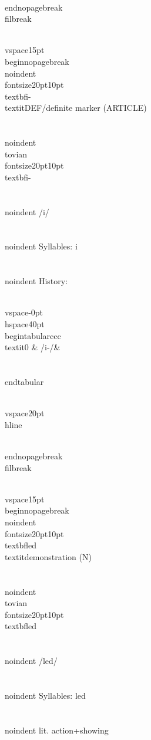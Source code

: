 \\end{nopagebreak}
\\filbreak



\\vspace{15pt}
\\begin{nopagebreak}
\\noindent{\\fontsize{20pt}{10pt}\\textbf{i-} } \\textit{DEF/definite marker} (ARTICLE)\\\\
\\noindent {\\tovian \\fontsize{20pt}{10pt} \\textbf{i-} }\\\\
\\noindent /{\textprimstress}i/\\\\
\\noindent Syllables: i\\\\


\\noindent History:

\\vspace{-0pt}
\\hspace{40pt}
\\begin{tabular}{ccc}
\\textit{0} & /i-/& \\\\
\\end{tabular}

\\vspace{20pt}\\hline

\\end{nopagebreak}
\\filbreak



\\vspace{15pt}
\\begin{nopagebreak}
\\noindent{\\fontsize{20pt}{10pt}\\textbf{led} } \\textit{demonstration} (N)\\\\
\\noindent {\\tovian \\fontsize{20pt}{10pt} \\textbf{led} }\\\\
\\noindent /l{\textprimstress}ed/\\\\
\\noindent Syllables: led\\\\
\\noindent lit. action+showing\\\\


